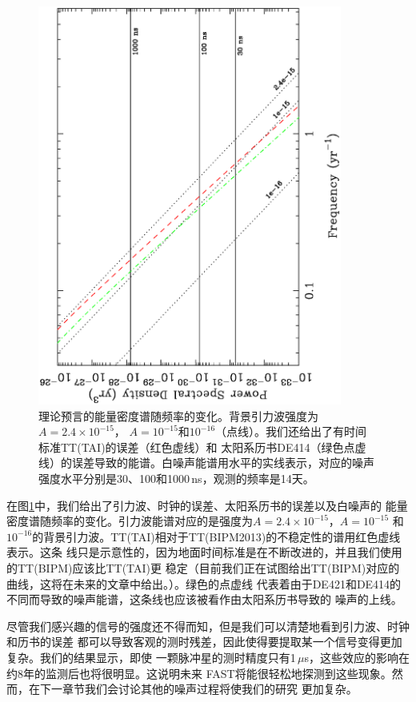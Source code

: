 \begin{figure}
\begin{center}
\includegraphics[angle=-90,width=10cm]{spectra1.ps}
\caption{理论预言的能量密度谱随频率的变化。背景引力波强度为$A = 2.4 \times 10^{-15}$，
$A = 10^{-15}$和$10^{-16}$（点线）。我们还给出了有时间标准TT(TAI)的误差（红色虚线）和
太阳系历书DE414（绿色点虚线）的误差导致的能谱。白噪声能谱用水平的实线表示，对应的噪声
强度水平分别是30、100和1000\,ns，观测的频率是14天。} 
\label{fg:spectra1}
\end{center}
\end{figure}

在图\ref{fg:spectra1}中，我们给出了引力波、时钟的误差、太阳系历书的误差以及白噪声的
能量密度谱随频率的变化。引力波能谱对应的是强度为$A = 2.4 \times 10^{-15}$，$A = 10^{-15}$
和$10^{-16}$的背景引力波。TT(TAI)相对于TT(BIPM2013)的不稳定性的谱用红色虚线表示。这条
线只是示意性的，因为地面时间标准是在不断改进的，并且我们使用的TT(BIPM)应该比TT(TAI)更
稳定（目前我们正在试图给出TT(BIPM)对应的曲线，这将在未来的文章中给出。）。绿色的点虚线
代表着由于DE421和DE414的不同而导致的噪声能谱，这条线也应该被看作由太阳系历书导致的
噪声的上线。

尽管我们感兴趣的信号的强度还不得而知，但是我们可以清楚地看到引力波、时钟和历书的误差
都可以导致客观的测时残差，因此使得要提取某一个信号变得更加复杂。我们的结果显示，即使
一颗脉冲星的测时精度只有1\,$\mu$s，这些效应的影响在约8年的监测后也将很明显。这说明未来
FAST将能很轻松地探测到这些现象。然而，在下一章节我们会讨论其他的噪声过程将使我们的研究
更加复杂。

